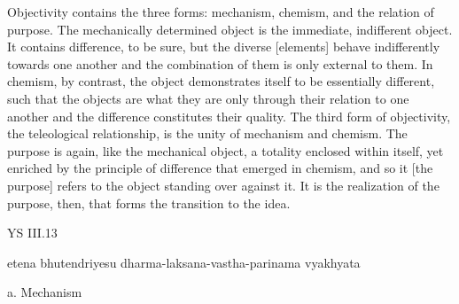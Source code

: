 Objectivity contains the three forms: mechanism, chemism, and the relation of purpose.
The mechanically determined object is the immediate, indifferent object.
It contains difference, to be sure, but the diverse [elements]
behave indifferently towards one another and the combination of them is only
external to them.
In chemism, by contrast, the object demonstrates itself to be essentially different,
such that the objects are what they are only through their
relation to one another and the difference constitutes their quality.
The third form of objectivity, the teleological relationship,
is the unity of mechanism and chemism.
The purpose is again, like the mechanical object, a totality enclosed within itself,
yet enriched by the principle of difference that emerged in chemism,
and so it [the purpose] refers to the object standing over against it.
It is the realization of the purpose, then, that forms the transition to the idea.

YS III.13

etena bhutendriyesu dharma-laksana-vastha-parinama vyakhyata

a. Mechanism

